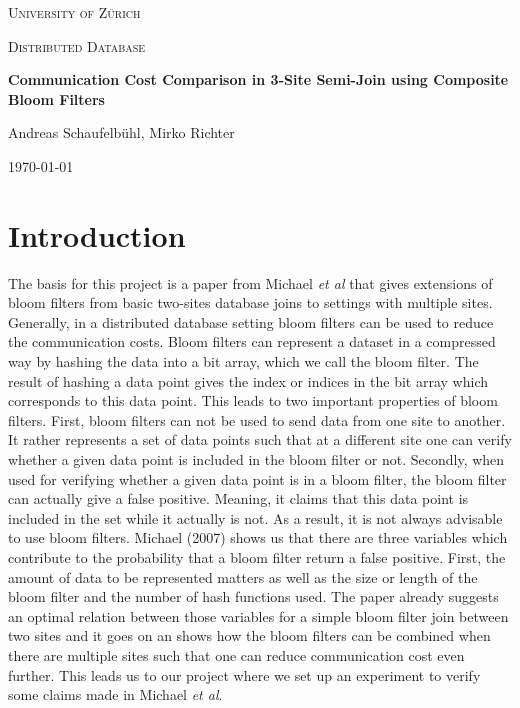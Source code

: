 \documentclass[12]{scrartcl}
\begin{document}
\begin{titlepage}
	\centering
	{\scshape\LARGE University of Zürich\par}
	\vspace{1cm}
	{\scshape\Large Distributed Database\par}
	\vspace{1.5cm}
	{\huge\bfseries Communication Cost Comparison in 3-Site Semi-Join using Composite Bloom Filters\par}
	\vspace{2cm}
	{\Large Andreas Schaufelbühl, Mirko Richter\par}
	\vfill
	
	{\large \today\par}
\end{titlepage}

	
\section{Introduction}
The basis for this project is a paper from Michael {\em et al}\cite{michael} that gives extensions of bloom filters from basic two-sites database joins to settings with multiple sites. Generally, in a distributed database setting bloom filters can be used to reduce the communication costs. Bloom filters can represent a dataset in a compressed way by hashing the data into a bit array, which we call the bloom filter. The result of hashing a data point gives the index or indices in the bit array which corresponds to this data point. This leads to two important properties of bloom filters. First, bloom filters can not be used to send data from one site to another. It rather represents a set of data points such that at a different site one can verify whether a given data point is included in the bloom filter or not. Secondly, when used for verifying whether a given data point is in a bloom filter, the bloom filter can actually give a false positive. Meaning, it claims that this data point is included in the set while it actually is not. As a result, it is not always advisable to use bloom filters. Michael (2007) shows us that there are three variables which contribute to the probability that a bloom filter return a false positive. First, the amount of data to be represented matters as well as the size or length of the bloom filter and the number of hash functions used. The paper already suggests an optimal relation between those variables for a simple bloom filter join between two sites and it goes on an shows how the bloom filters can be combined when there are multiple sites such that one can reduce communication cost even further. This leads us to our project where we set up an experiment to verify some claims made in Michael {\em et al}\cite{michael}.
\end{document}
